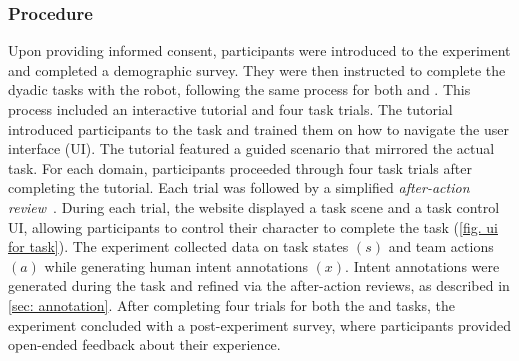 \subsubsection{Procedure}
\label{sec: data collection procedures}
Upon providing informed consent, participants were introduced to the experiment and completed a demographic survey. They were then instructed to complete the dyadic tasks with the robot, following the same process for both \movers and \rescue. This process included an interactive tutorial and four task trials. The tutorial introduced participants to the task and trained them on how to navigate the user interface (UI). The tutorial featured a guided scenario that mirrored the actual task.
For each domain, participants proceeded through four task trials after completing the tutorial. Each trial was followed by a simplified \textit{after-action review}~\cite{morrison1999foundations, taberski2021visualizing, qian2024measuring}. 
During each trial, the website displayed a task scene and a task control UI, allowing participants to control their character to complete the task (\cref{fig. ui for task}). The experiment collected data on task states $(s)$ and team actions $(a)$ while generating human intent annotations $(x)$. Intent annotations were generated during the task and refined via the after-action reviews, as described in \cref{sec: annotation}. After completing four trials for both the \movers and \rescue tasks, the experiment concluded with a post-experiment survey, where participants provided open-ended feedback about their experience.

